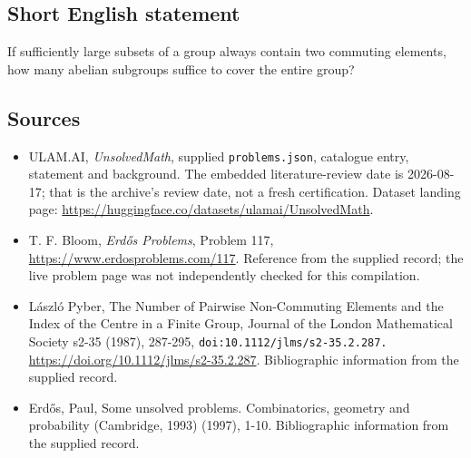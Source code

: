 \documentclass[11pt,a4paper]{article}
\begin{document}
\subsection{Short English statement}

If sufficiently large subsets of a group always contain two commuting elements, how many abelian subgroups suffice to cover the entire group?

\subsection{Sources}

{\small

\begin{itemize}

\item[\hypertarget{source:statement:1}{S1}] ULAM.AI, \emph{UnsolvedMath}, supplied \texttt{problems.json}, catalogue entry, statement and background. The embedded literature-review date is 2026-08-17; that is the archive’s review date, not a fresh certification. Dataset landing page: \url{https://huggingface.co/datasets/ulamai/UnsolvedMath}.

\item[\hypertarget{source:statement:2}{S2}] T. F. Bloom, \emph{Erdős Problems}, Problem 117, \url{https://www.erdosproblems.com/117}. Reference from the supplied record; the live problem page was not independently checked for this compilation.

\item[\hypertarget{source:statement:3}{S3}] László Pyber, The Number of Pairwise Non-Commuting Elements and the Index of the Centre in a Finite Group, Journal of the London Mathematical Society s2-35 (1987), 287-295, \nolinkurl{doi:10.1112/jlms/s2-35.2.287.} \url{https://doi.org/10.1112/jlms/s2-35.2.287}. Bibliographic information from the supplied record.

\item[\hypertarget{source:statement:4}{S4}] Erd\H{o}s, Paul, Some unsolved problems. Combinatorics, geometry and probability (Cambridge, 1993) (1997), 1-10. Bibliographic information from the supplied record.

\end{itemize}

}

\label{end:statement}
\end{document}
